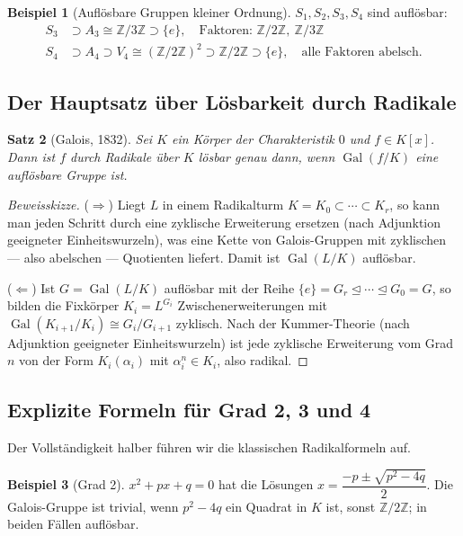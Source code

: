 \documentclass[12pt,a4paper]{amsart}
\newtheorem{theorem}{Satz}[section]
\theoremstyle{definition}
\newtheorem{beispiel}[theorem]{Beispiel}
\newcommand{\Z}{\mathbb{Z}}
\newcommand{\Gal}{\operatorname{Gal}}
\begin{document}
\begin{beispiel}[Auflösbare Gruppen kleiner Ordnung]
$S_1, S_2, S_3, S_4$ sind auflösbar:
\begin{align*}
  S_3 &\supset A_3 \cong \Z/3\Z \supset \{e\},
  \quad \text{Faktoren: } \Z/2\Z,\ \Z/3\Z \\
  S_4 &\supset A_4 \supset V_4 \cong (\Z/2\Z)^2 \supset \Z/2\Z \supset \{e\},
  \quad \text{alle Faktoren abelsch.}
\end{align*}
\end{beispiel}

\subsection{Der Hauptsatz über Lösbarkeit durch Radikale}

\begin{theorem}[Galois, 1832]
\label{thm:loesbar}
Sei $K$ ein Körper der Charakteristik $0$ und $f \in K[x]$. Dann ist $f$
durch Radikale über $K$ lösbar genau dann, wenn $\Gal(f/K)$ eine auflösbare
Gruppe ist.
\end{theorem}

\begin{proof}[Beweisskizze]
($\Rightarrow$) Liegt $L$ in einem Radikalturm $K = K_0 \subset \cdots \subset
K_r$, so kann man jeden Schritt durch eine zyklische Erweiterung ersetzen
(nach Adjunktion geeigneter Einheitswurzeln), was eine Kette von Galois-Gruppen
mit zyklischen — also abelschen — Quotienten liefert. Damit ist $\Gal(L/K)$
auflösbar.

($\Leftarrow$) Ist $G = \Gal(L/K)$ auflösbar mit der Reihe
$\{e\} = G_r \trianglelefteq \cdots \trianglelefteq G_0 = G$, so bilden die
Fixkörper $K_i = L^{G_i}$ Zwischenerweiterungen mit
$\Gal(K_{i+1}/K_i) \cong G_i/G_{i+1}$ zyklisch. Nach der Kummer-Theorie
(nach Adjunktion geeigneter Einheitswurzeln) ist jede zyklische Erweiterung
vom Grad $n$ von der Form $K_i(\alpha_i)$ mit $\alpha_i^n \in K_i$, also
radikal.
\end{proof}

\subsection{Explizite Formeln für Grad 2, 3 und 4}

Der Vollständigkeit halber führen wir die klassischen Radikalformeln auf.

\begin{beispiel}[Grad 2]
$x^2 + px + q = 0$ hat die Lösungen
$x = \dfrac{-p \pm \sqrt{p^2 - 4q}}{2}$.
Die Galois-Gruppe ist trivial, wenn $p^2 - 4q$ ein Quadrat in $K$ ist,
sonst $\Z/2\Z$; in beiden Fällen auflösbar.
\end{beispiel}
\end{document}
